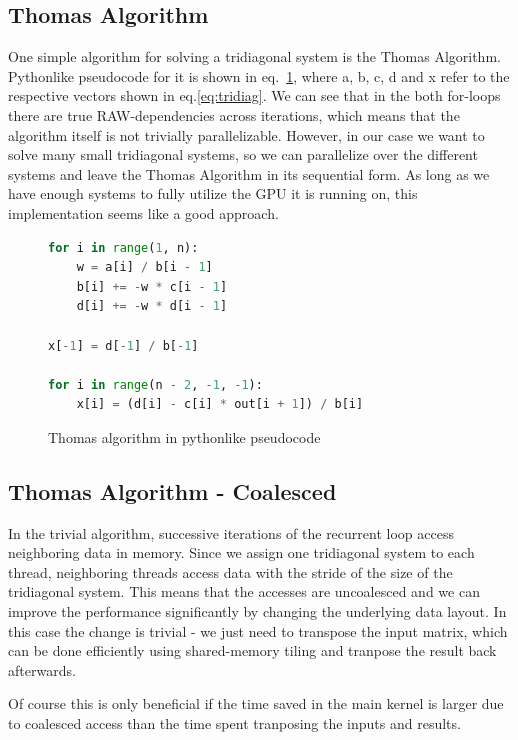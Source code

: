 \documentclass[a4paper,oneside]{memoir}
\begin{document}
\subsection{Thomas Algorithm}
One simple algorithm for solving a tridiagonal system is the Thomas Algorithm.
Pythonlike pseudocode for it is shown in eq.~\ref{fig:thomas}, where a, b, c, d and x refer to the respective vectors shown in eq.\ref{eq:tridiag}.
We can see that in the both for-loops there are true RAW-dependencies across iterations, which means that the algorithm itself is not trivially parallelizable.
However, in our case we want to solve many small tridiagonal systems, so we can parallelize over the different systems and leave the Thomas Algorithm in its sequential form.
As long as we have enough systems to fully utilize the GPU it is running on, this implementation seems like a good approach.

\begin{figure}[hbtp]
    \caption{Thomas algorithm in pythonlike pseudocode}
    \label{fig:thomas}
    \begin{lstlisting}[language=python,frame=single]
for i in range(1, n):
    w = a[i] / b[i - 1]
    b[i] += -w * c[i - 1]
    d[i] += -w * d[i - 1]

x[-1] = d[-1] / b[-1]

for i in range(n - 2, -1, -1):
    x[i] = (d[i] - c[i] * out[i + 1]) / b[i]
    \end{lstlisting}
\end{figure}


\subsection{Thomas Algorithm - Coalesced}
\label{sec:thomas_coal}
In the trivial algorithm, successive iterations of the recurrent loop access neighboring data in memory.
Since we assign one tridiagonal system to each thread, neighboring threads access data with the stride of the size of the tridiagonal system. This means that the accesses are uncoalesced and we can improve the performance significantly by changing the underlying data layout. 
In this case the change is trivial - we just need to transpose the input matrix, which can be done efficiently using shared-memory tiling and tranpose the result back afterwards. 

Of course this is only beneficial if the time saved in the main kernel is larger due to coalesced access than the time spent tranposing the inputs and results.
\end{document}
